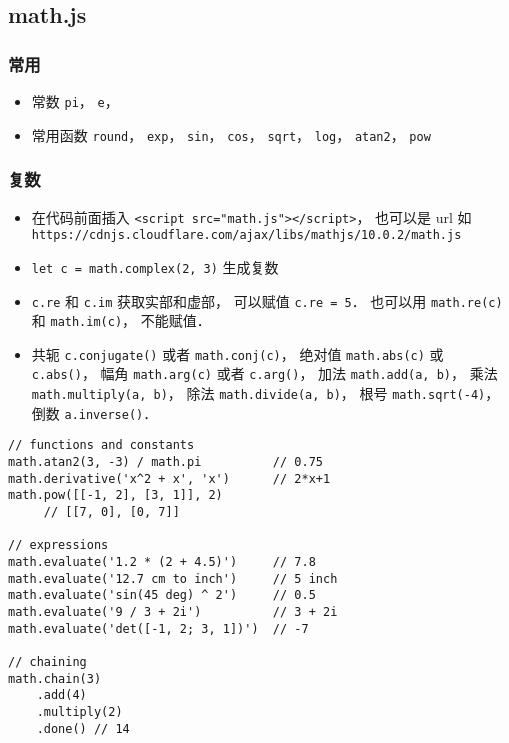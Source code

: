 \subsection{math.js}
\subsubsection{常用}
\begin{itemize}
\item 常数 \verb|pi|， \verb|e|， 
\item 常用函数 \verb|round|， \verb|exp|， \verb|sin|， \verb|cos|， \verb|sqrt|， \verb|log|， \verb|atan2|， \verb|pow|
\end{itemize}

\subsubsection{复数}
\begin{itemize}
\item 在代码前面插入 \verb|<script src="math.js"></script>|， 也可以是 url 如 \verb|https://cdnjs.cloudflare.com/ajax/libs/mathjs/10.0.2/math.js|
\item \verb|let c = math.complex(2, 3)| 生成复数
\item \verb|c.re| 和 \verb|c.im| 获取实部和虚部， 可以赋值 \verb|c.re = 5|． 也可以用 \verb|math.re(c)| 和 \verb|math.im(c)|， 不能赋值．
\item 共轭 \verb|c.conjugate()| 或者 \verb|math.conj(c)|， 绝对值 \verb|math.abs(c)| 或 \verb|c.abs()|， 幅角 \verb|math.arg(c)| 或者 \verb|c.arg()|， 加法 \verb|math.add(a, b)|， 乘法 \verb|math.multiply(a, b)|， 除法 \verb|math.divide(a, b)|， 根号 \verb|math.sqrt(-4)|， 倒数 \verb|a.inverse()|．
\end{itemize}


\begin{lstlisting}
// functions and constants
math.atan2(3, -3) / math.pi          // 0.75
math.derivative('x^2 + x', 'x')      // 2*x+1
math.pow([[-1, 2], [3, 1]], 2)
     // [[7, 0], [0, 7]]

// expressions
math.evaluate('1.2 * (2 + 4.5)')     // 7.8
math.evaluate('12.7 cm to inch')     // 5 inch
math.evaluate('sin(45 deg) ^ 2')     // 0.5
math.evaluate('9 / 3 + 2i')          // 3 + 2i
math.evaluate('det([-1, 2; 3, 1])')  // -7

// chaining
math.chain(3)
    .add(4)
    .multiply(2)
    .done() // 14
\end{lstlisting}